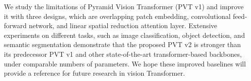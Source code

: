 \documentclass[10pt,twocolumn,letterpaper]{article}
\begin{document}
	We study the limitations of Pyramid Vision Transformer (PVT v1) and improve it with three designs, which are overlapping patch embedding, convolutional feed-forward network, and linear spatial reduction attention layer.
Extensive experiments on different tasks, such as image classification, object detection, and semantic segmentation demonstrate that the proposed PVT v2 is stronger than its predecessor PVT v1 and other state-of-the-art transformer-based backbones, under comparable numbers of parameters.
We hope these improved baselines will provide a reference for future research in vision Transformer.
	
	{\small
		
		
	}
	
\end{document}
